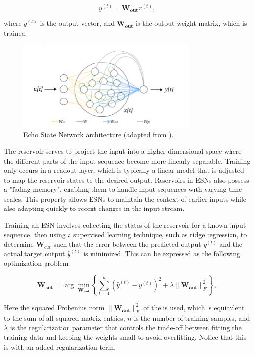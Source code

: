 \documentclass[11pt]{article}
\begin{document}
\begin{equation}
y^{(t)} = \mathbf{W_{out}}x^{(t)},
\end{equation}

where $y^{(t)}$ is the output vector, and $\mathbf{W_{out}}$ is the output weight matrix, which is trained.

\begin{figure}[h] 
\centering 
\includegraphics[width=0.8\textwidth]{echo_diagram.png} 
\caption{Echo State Network architecture (adapted from \cite{reservoirpy}).}
\label{fig:esn}
\end{figure}

The reservoir serves to project the input into a higher-dimensional space where the different parts of the input sequence become more linearly separable. Training only occurs in a readout layer, which is typically a linear model that is adjusted to map the reservoir states to the desired output. Reservoirs in ESNs also possess a "fading memory", enabling them to handle input sequences with varying time scales. This property allows ESNs to maintain the context of earlier inputs while also adapting quickly to recent changes in the input stream.

Training an ESN involves collecting the states of the reservoir for a known input sequence, then using a supervised learning technique, such as ridge regression, to determine $\mathbf{W}_{out}$ such that the error between the predicted output $y^{(t)}$ and the actual target output $\hat{y}^{(t)}$ is minimized. This can be expressed as the following optimization problem:

\begin{equation}
\mathbf{W_{out}} = \arg\min_{\mathbf{W_{out}}} \left\{\sum_{t=1}^{n} (\hat{y}^{(t)} - y^{(t)})^2 + \lambda \|\mathbf{W_{out}}\|_F^2\right\},
\end{equation}


Here the squared Frobenius norm $\|\mathbf{W_{out}}\|_F^2$ of the is used, which is equiavlent to the sum of all squared matrix entries, $n$ is the number of training samples, and $\lambda$ is the regularization parameter that controls the trade-off between fitting the training data and keeping the weights small to avoid overfitting. Notice that this is  with an added regularization term.
\end{document}
